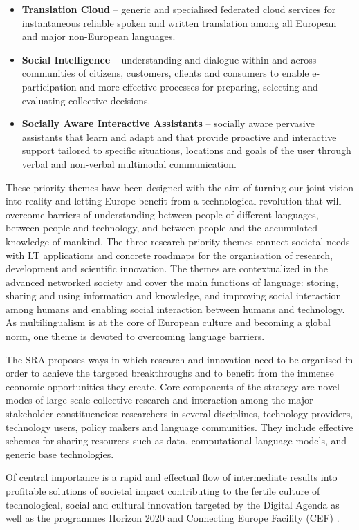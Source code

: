 \documentclass[10pt, plain]{../../metanetpaper}
\begin{document}
\begin{multicols}{2}
\begin{itemize}
\item \textbf{Translation Cloud} – generic and specialised federated cloud services for instantaneous reliable spoken and written translation among all European and major non-European languages.
\item \textbf{Social Intelligence} – understanding and dialogue within and across communities of citizens, customers, clients and consumers to enable e-participation and more effective processes for preparing, selecting and evaluating collective decisions.
\item \textbf{Socially Aware Interactive Assistants} – socially aware pervasive assistants that learn and adapt and that provide proactive and interactive support tailored to specific situations, locations and goals of the user through verbal and non-verbal multimodal communication.
\end{itemize}

These priority themes have been designed with the aim of turning our joint vision into reality and letting Europe beneﬁt from a technological revolution that will overcome barriers of understanding between people of diﬀerent languages, between people and technology, and between people and the accumulated knowledge of mankind. The three research priority themes connect societal needs with LT applications and concrete roadmaps for the organisation of research, development and scientiﬁc innovation. The themes are contextualized in the advanced networked society and cover the main functions of language: storing, sharing and using information and knowledge, and improving social interaction among humans and enabling social interaction between humans and technology. As multilingualism is at the core of European culture and becoming a global norm, one theme is devoted to overcoming language barriers. 

The SRA proposes ways in which research and innovation need to be organised in order to achieve the targeted breakthroughs and to beneﬁt from the immense economic opportunities they create. Core components of the strategy are novel modes of large-scale collective research and interaction among the major stakeholder constituencies: researchers in several disciplines, technology providers, technology users, policy makers and language communities. They include eﬀective schemes for sharing resources such as data, computational language models, and generic base technologies.

Of central importance is a rapid and eﬀectual ﬂow of intermediate results into proﬁtable solutions of societal impact contributing to the fertile culture of technological, social and cultural innovation targeted by the Digital Agenda \cite{DA2010} as well as the programmes Horizon 2020 \cite{H2020} and Connecting Europe Facility (CEF) \cite{CEF2011}. 


\end{multicols}
\end{document}
